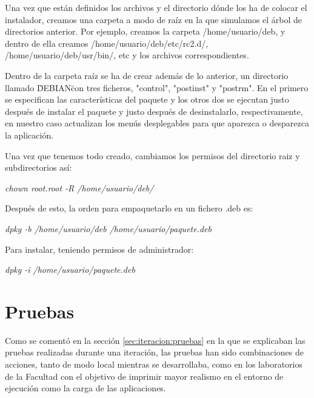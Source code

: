 


Una vez que están definidos los archivos y el directorio dónde los ha de colocar el instalador, creamos una carpeta a modo de raíz en la que simulamos el árbol de directorios anterior. Por ejemplo, creamos la carpeta /home/usuario/deb, y dentro de ella creamos /home/usuario/deb/etc/rc2.d/, /home/usuario/deb/usr/bin/, etc y los archivos correspondientes.
\newline

Dentro de la carpeta raíz se ha de crear además de lo anterior, un directorio llamado \"DEBIAN\" con tres ficheros, "control", "postinst" y "postrm". En el primero se especifican las características del paquete y los otros dos se ejecutan justo después de instalar el paquete y justo después de desinstalarlo, respectivamente, en nuestro caso actualizan los menús desplegables para que aparezca o desparezca la aplicación.
\newline

Una vez que tenemos todo creado, cambiamos los permisos del directorio raiz y subdirectorios así:

\begin{center}
    \emph{chown root.root -R /home/usuario/deb/}
\end{center}

Después de esto, la orden para empaquetarlo en un fichero .deb es:

\begin{center}
    \emph{dpkg -b /home/usuario/deb /home/usuario/paquete.deb}
\end{center}

Para instalar, teniendo permisos de administrador:

\begin{center}
    \emph{dpkg -i /home/usuario/paquete.deb}
\end{center}




\section{Pruebas}
\label{sec:implementacion:pruebas}

Como se comentó en la sección \ref{sec:iteracion:pruebas} en la que se explicaban las pruebas realizadas durante una iteración, las pruebas han sido combinaciones de acciones, tanto de modo local mientras se desarrollaba, como en los laboratorios de la Facultad con el objetivo de imprimir mayor realismo en el entorno de ejecución como la carga de las aplicaciones.
\newline

